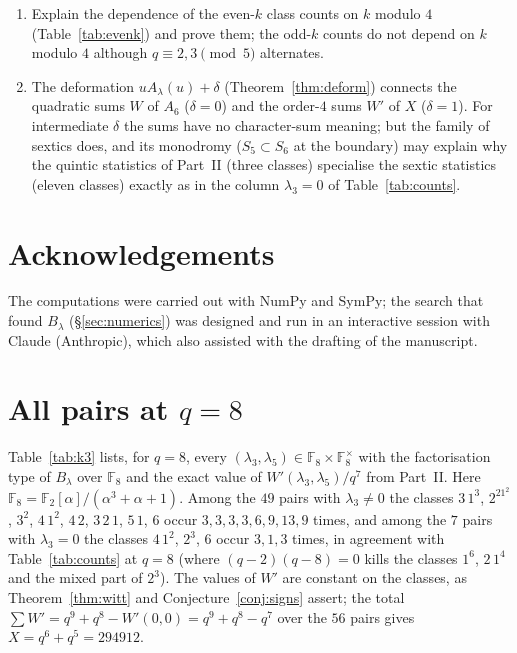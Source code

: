 \documentclass[12pt,a4paper]{amsart}
\theoremstyle{definition}
\newcommand{\F}{\mathbb{F}}
\begin{document}
\begin{enumerate}[label=\textbf{Open Problem \arabic*.},wide,labelindent=0pt,itemsep=0.8ex]
\item Explain the dependence of the even-$k$ class counts on $k$ modulo $4$ (Table~\ref{tab:evenk}) and prove them; the odd-$k$ counts do not depend on $k$ modulo $4$ although $q\equiv2,3\pmod5$ alternates.
\item The deformation $uA_\lambda(u)+\delta$ (Theorem~\ref{thm:deform}) connects the quadratic sums $W$ of $A_6$ ($\delta=0$) and the order-$4$ sums $W'$ of $X$ ($\delta=1$). For intermediate $\delta$ the sums have no character-sum meaning; but the family of sextics does, and its monodromy ($S_5\subset S_6$ at the boundary) may explain why the quintic statistics of Part~II (three classes) specialise the sextic statistics (eleven classes) exactly as in the column $\lambda_3=0$ of Table~\ref{tab:counts}.
\end{enumerate}

\section*{Acknowledgements}
The computations were carried out with NumPy and SymPy; the search that found $B_\lambda$ (\S\ref{sec:numerics}) was designed and run in an interactive session with Claude (Anthropic), which also assisted with the drafting of the manuscript.

\appendix

\section{All pairs at \texorpdfstring{$q=8$}{q=8}}\label{app:k3}
Table~\ref{tab:k3} lists, for $q=8$, every $(\lambda_3,\lambda_5)\in\F_8\times\F_8^\times$ with the factorisation type of $B_\lambda$ over $\F_8$ and the exact value of $W'(\lambda_3,\lambda_5)/q^7$ from Part~II. Here $\F_8=\F_2[\alpha]/(\alpha^3+\alpha+1)$. Among the $49$ pairs with $\lambda_3\ne0$ the classes $3\,1^3$, $2^21^2$, $3^2$, $4\,1^2$, $4\,2$, $3\,2\,1$, $5\,1$, $6$ occur $3,3,3,3,6,9,13,9$ times, and among the $7$ pairs with $\lambda_3=0$ the classes $4\,1^2$, $2^3$, $6$ occur $3,1,3$ times, in agreement with Table~\ref{tab:counts} at $q=8$ (where $(q-2)(q-8)=0$ kills the classes $1^6$, $2\,1^4$ and the mixed part of $2^3$). The values of $W'$ are constant on the classes, as Theorem~\ref{thm:witt} and Conjecture~\ref{conj:signs} assert; the total $\sum W'=q^9+q^8-W'(0,0)=q^9+q^8-q^7$ over the $56$ pairs gives $X=q^6+q^5=294912$.

\begin{table}[H]
\centering
\caption{$q=8$: all pairs $(\lambda_3,\lambda_5)$, the class of $B_\lambda$ and $W'/q^7$ (generated by \texttt{appendix\_table\_k3.py}).}\label{tab:k3}
\footnotesize

\end{table}
\end{document}
